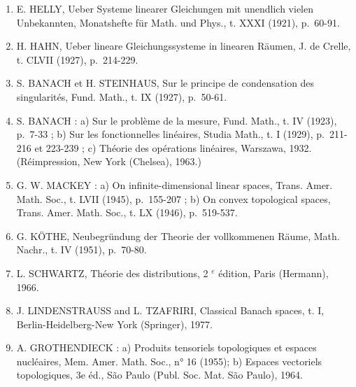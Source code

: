 \begin{enumerate}
\item
  E. HELLY, Ueber Systeme linearer Gleichungen mit unendlich vielen Unbekannten, Monatshefte für Math. und Phys., t. XXXI (1921), p.~60-91.
\item
  H. HAHN, Ueber lineare Gleichungssysteme in linearen Räumen, J. de Crelle, t. CLVII (1927), p.~214-229.
\item
  S. BANACH et H. STEINHAUS, Sur le principe de condensation des singularités, Fund. Math., t. IX (1927), p.~50-61.
\item
  S. BANACH : a) Sur le problème de la mesure, Fund. Math., t. IV (1923), p.~7-33 ; b) Sur les fonctionnelles linéaires, Studia Math., t. I (1929), p.~211-216 et 223-239 ; c) Théorie des opérations linéaires, Warszawa, 1932. (Réimpression, New York (Chelsea), 1963.)
\item
  G. W. MACKEY : a) On infinite-dimensional linear spaces, Trans. Amer. Math. Soc., t. LVII (1945), p.~155-207 ; b) On convex topological spaces, Trans. Amer. Math. Soc., t. LX (1946), p.~519-537.
\item
  G. KÖTHE, Neubegründung der Theorie der vollkommenen Räume, Math. Nachr., t. IV (1951), p.~70-80.
\item
  L. SCHWARTZ, Théorie des distributions, 2 \(^{e}\) édition, Paris (Hermann), 1966.
\item
  J. LINDENSTRAUSS and L. TZAFRIRI, Classical Banach spaces, t. I, Berlin-Heidelberg-New York (Springer), 1977.
\item
  A. GROTHENDIECK : a) Produits tensoriels topologiques et espaces nucléaires, Mem. Amer. Math. Soc., n° 16 (1955); b) Espaces vectoriels topologiques, 3e éd., São Paulo (Publ. Soc. Mat. São Paulo), 1964.
\end{enumerate}

